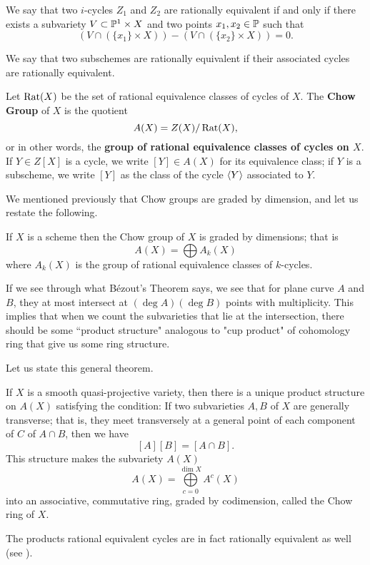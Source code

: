 	\begin{definition}
		We say that two $i$-cycles $Z_1$ and $Z_2$ 
		are rationally equivalent if and only if 
		there exists a subvariety $V \subset \P^1 \times X$ 
		and two points $x_1, x_2 \in \P$ such that
		\[
		(V \cap (\{x_1\} \times X)) - (V \cap (\{x_2\} \times X)) = 0.
		\]
		
		We say that two subschemes are rationally equivalent if 
		their associated cycles are rationally equivalent.
	\end{definition}

	\begin{definition}
		Let $\rat(X)$ be the set of rational equivalence classes 
		of cycles of $X$.
		The \textbf{Chow Group} of $X$ is the quotient
		\[
		A(X) = Z(X)/\rat(X),
		\]
		or in other words,
		the \textbf{group of rational equivalence classes of cycles 
		on $X$}. 
		If $Y \in Z[X]$ is a cycle, we write $[Y] \in A(X)$ 
		for its equivalence class;
		if $Y$ is a subscheme, we write $[Y]$ 
		as the class of the cycle $\inner{Y}$ associated to $Y$. 
	\end{definition}

We mentioned previously that Chow groups are graded by dimension,
and let us restate the following.
	\begin{theorem}
		If $X$ is a scheme then the Chow group of $X$ 
		is graded by dimensions;
		that is 
		\[
		A(X) = \bigoplus A_k(X)
		\]
		where $A_k(X)$ is the group of rational equivalence classes of
		$k$-cycles. 
	\end{theorem}

If we see through what B\'{e}zout's Theorem says,
we see that for plane curve $A$ and $B$, they at most intersect at 
$(\deg A)(\deg B)$ points with multiplicity. 
This implies that when we count the subvarieties that lie at the intersection,
there should be some ``product structure" analogous to "cup product" 
of cohomology ring that give us some ring structure.

Let us state this general theorem.
	\begin{theorem}
		If $X$ is a smooth quasi-projective variety,
		then there is a unique product structure on $A(X)$ 
		satisfying the condition:
		If two subvarieties $A, B$ of $X$ are generally transverse;
		that is, they meet transversely at a general point of each component of $C$ of $A \cap B$,
		then we have
		\[
		[A][B] = [A \cap B].
		\]
		This structure makes the subvariety $A(X)$ 
		\[
		A(X) = \bigoplus\limits_{c = 0}^{\dim X} A^c(X)
		\]
		into an associative, commutative ring, 
		graded by codimension, called the Chow ring of $X$. 
	\end{theorem}
	The products rational equivalent cycles are in fact 
	rationally equivalent as well (see \citet{Fulton1993}). 
